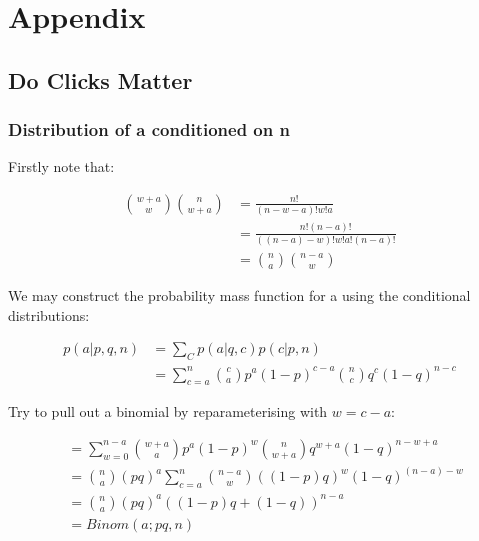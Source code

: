 \documentclass[11pt,a4,singlespacing,titlepagenumber=on]{scrreprt}
\numberwithin{equation}{chapter} %
\theoremstyle{remark}
\begin{document}
{}


\appendix %


\chapter{Appendix}

\section{Do Clicks Matter}

\subsection{Distribution of a conditioned on n}

Firstly note that:

\begin{align}
{w+a \choose w}{n \choose w+a} &= \frac{n!}{(n-w-a)!w!a} \\
	&= \frac{n!(n-a)!}{((n-a)-w)!w!a!(n-a)!} \\
	&=  {n \choose a}{n-a \choose w}
\end{align}

We may construct the probability mass function for a using the conditional distributions:

\begin{align}
p(a|p,q,n) &= \sum_C p(a|q,c)p(c|p,n) \\
 &= \sum_{c=a}^n {c \choose a} p^a(1-p)^{c-a} {n \choose c} q^c (1-q)^{n-c}
\end{align}

Try to pull out a binomial by reparameterising with $ w = c-a$:

\begin{align}
&= \sum_{w=0}^{n-a} {w+a \choose a} p^a(1-p)^w {n \choose w+a} q^{w+a} (1-q)^{n-w+a} \\
&= {n \choose a} (pq)^a \sum_{c=a}^n {n-a \choose w} ((1-p)q)^w (1-q)^{(n-a)-w} \\
&= {n \choose a} (pq)^a ((1-p)q +  (1-q))^{n-a} \\
&= Binom(a;pq,n)
\end{align}
\end{document}

